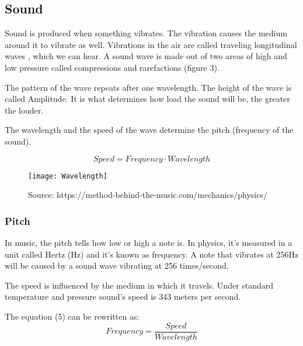 \subsection{Sound}
\par
Sound is produced when something vibrates. The vibration causes the medium around it to vibrate as well. Vibrations in the air are called traveling longitudinal waves \cite{physics_of_sound}, which we can hear.
A sound wave is made out of two areas of high and low pressure called compressions and rarefactions (figure 3). \par

The pattern of the wave repeats after one wavelength. The height of the wave is called Amplitude. It is what determines how load the sound will be, the greater the louder.

The wavelength and the speed of the wave determine the pitch (frequency of the sound). \par 


\begin{equation}
Speed = Frequency \cdot Wavelength
\end{equation}

\begin{figure}[h]
	\centering
	\texttt{[image: Wavelength]}
	\caption[Traveling Wave]{
		Source: https://method-behind-the-music.com/mechanics/physics/ }
\end{figure}

\subsubsection{Pitch}
In music, the pitch tells how low or high a note is. In physics, it's measured in a unit called Hertz (Hz) and it's known as frequency. A note that vibrates at 256Hz will be caused by a sound wave vibrating at 256 times/second. \par

The speed is influenced by the medium in which it travels. Under standard temperature and pressure sound's speed is 343 meters per second. \cite{speed_of_sound}

The equation (5) can be rewritten as:
\begin{equation}
Frequency = \dfrac{Speed}{Wavelength}
\end{equation}


